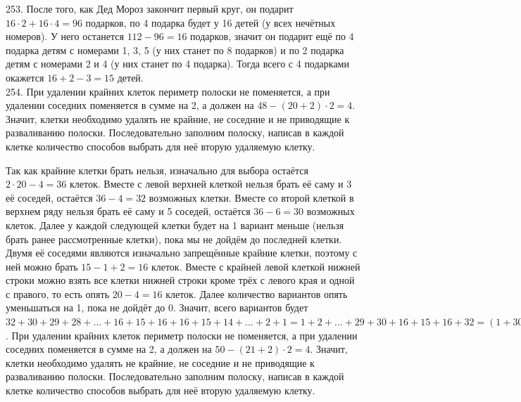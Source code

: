 \documentclass[12pt]{article}
\begin{document}
253. После того, как Дед Мороз закончит первый круг, он подарит $16\cdot2+16\cdot4=96$ подарков, по 4 подарка будет у 16 детей (у всех нечётных номеров). У него останется $112-96=16$ подарков, значит он подарит ещё по 4 подарка детям с номерами 1, 3, 5 (у них станет по 8 подарков) и по 2 подарка детям с номерами 2 и 4 (у них станет по 4 подарка). Тогда всего с 4 подарками окажется $16+2-3=15$ детей.\\
254. При удалении крайних клеток периметр полоски не поменяется, а при удалении соседних поменяется в сумме на 2, а должен на $48-(20+2)\cdot2=4.$ Значит, клетки необходимо удалять не крайние, не соседние и не приводящие к разваливанию полоски. Последовательно заполним полоску, написав в каждой клетке количество способов выбрать для неё вторую удаляемую клетку.
\begin{center}
\begin{figure}[ht!]
\end{figure}
\end{center}
Так как крайние клетки брать нельзя, изначально для выбора остаётся $2\cdot20-4=36$ клеток. Вместе с левой верхней клеткой нельзя брать её саму и 3 её соседей, остаётся $36-4=32$ возможных клетки. Вместе со второй клеткой в верхнем ряду нельзя брать её саму и 5 соседей, остаётся $36-6=30$ возможных клеток. Далее у каждой следующей клетки будет на 1 вариант меньше (нельзя брать ранее рассмотренные клетки), пока мы не дойдём до последней клетки. Двумя её соседями являются изначально запрещённые крайние клетки, поэтому с ней можно брать $15-1+2=16$ клеток. Вместе с крайней левой клеткой нижней строки можно взять все клетки нижней строки кроме трёх с левого края и одной с правого, то есть опять $20-4=16$ клеток. Далее количество вариантов опять уменьшаться на 1, пока не дойдёт до 0. Значит, всего вариантов будет $32+30+29+28+\ldots+16+15+16+16+15+14+\ldots+2+1=1+2+\ldots+29+30+16+15+16+32=(1+30)+(2+29)+\ldots+(15+16)+79=31\cdot15+79=544.$\newpage{}. При удалении крайних клеток периметр полоски не поменяется, а при удалении соседних поменяется в сумме на 2, а должен на $50-(21+2)\cdot2=4.$ Значит, клетки необходимо удалять не крайние, не соседние и не приводящие к разваливанию полоски. Последовательно заполним полоску, написав в каждой клетке количество способов выбрать для неё вторую удаляемую клетку.
\end{document}
